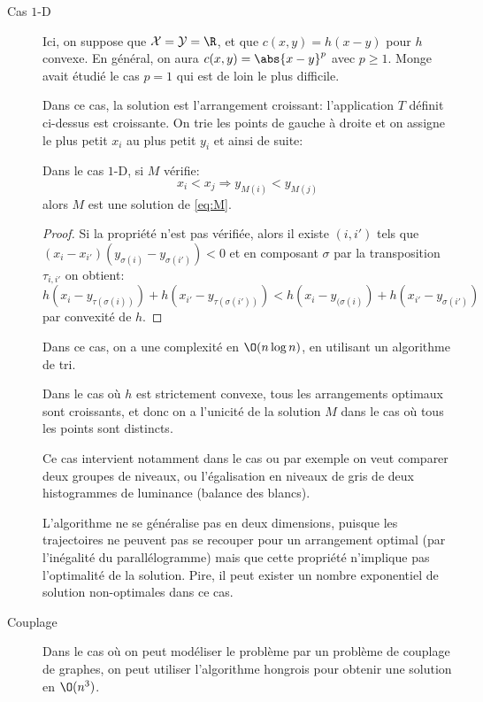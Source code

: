 \begin{description}
	\item[Cas $1$-D]
	      Ici, on suppose que $\X = \Y = \R$, et que $c(x, y) = h(x - y)$ pour $h$ convexe.
	      En général, on aura $c(x, y) = \abs{x - y}^{p}$ avec $p \geq 1$.
	      Monge avait étudié le cas $p = 1$ qui est de loin le plus difficile.

	      Dans ce cas, la solution est l'arrangement croissant: l'application $T$ définit ci-dessus est croissante.
	      On trie les points de gauche à droite et on assigne le plus petit $x_{i}$ au plus petit $y_{i}$ et ainsi de suite:
	      \begin{thm}
		      Dans le cas $1$-D, si $M$ vérifie:
		      \begin{equation*}
			      x_{i} < x_{j} \Rightarrow y_{M(i)} < y_{M(j)}
		      \end{equation*}
		      alors $M$ est une solution de \eqref{eq:M}.
	      \end{thm}
	      \begin{proof}
		      Si la propriété n'est pas vérifiée, alors il existe $(i, i')$ tels que $(x_{i} - x_{i'})(y_{\sigma(i)} - y_{\sigma(i')}) < 0$ et en composant $\sigma$ par la transposition $\tau_{i, i'}$ on obtient:
		      \begin{equation*}
			      h(x_{i} - y_{\tau(\sigma(i))}) + h(x_{i'} - y_{\tau(\sigma(i'))}) < h(x_{i} - y_{(\sigma(i)}) + h(x_{i'} - y_{\sigma(i')})
		      \end{equation*}
		      par convexité de $h$.
	      \end{proof}
	      \begin{corollaire}
		      Dans ce cas, on a une complexité en $\O(n \log n)$, en utilisant un algorithme de tri.
	      \end{corollaire}
	      \begin{remarque}
		      Dans le cas où $h$ est strictement convexe, tous les arrangements optimaux sont croissants, et donc on a l'unicité de la solution $M$ dans le cas où tous les points sont distincts.
	      \end{remarque}
	      Ce cas intervient notamment dans le cas ou par exemple on veut comparer deux groupes de niveaux,
	      ou l'égalisation en niveaux de gris de deux histogrammes de luminance (balance des blancs).

	      L'algorithme ne se généralise pas en deux dimensions, puisque les trajectoires ne
	      peuvent pas se recouper pour un arrangement optimal (par l'inégalité du parallélogramme)
	      mais que cette propriété n'implique pas l'optimalité de la solution.
	      Pire, il peut exister un nombre exponentiel de solution non-optimales dans ce cas.

	\item[Couplage] Dans le cas où on peut modéliser le problème par un problème de couplage
	      de graphes, on peut utiliser l'algorithme hongrois pour obtenir une solution en $\O(n^{3})$.
\end{description}

